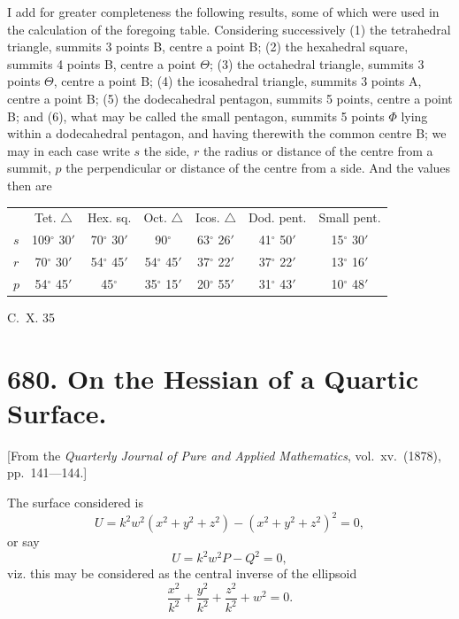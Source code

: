 \documentclass[12pt,a4paper]{article}
\theoremstyle{cayley}
\theoremstyle{definition}
\numberwithin{equation}{section}
\begin{document}
I add for greater completeness the following results, some of which were used in the calculation of the foregoing table. Considering successively (1) the tetrahedral triangle, summits 3 points B, centre a point B; (2) the hexahedral square, summits 4 points B, centre a point $\Theta$; (3) the octahedral triangle, summits 3 points $\Theta$, centre a point B; (4) the icosahedral triangle, summits 3 points A, centre a point B; (5) the dodecahedral pentagon, summits 5 points, centre a point B; and (6), what may be called the small pentagon, summits 5 points $\Phi$ lying within a dodecahedral pentagon, and having therewith the common centre B; we may in each case write $s$ the side, $r$ the radius or distance of the centre from a summit, $p$ the perpendicular or distance of the centre from a side. And the values then are

\begin{center}
\begin{tabular}{lcccccc}
 & Tet. $\triangle$ & Hex. sq. & Oct. $\triangle$ & Icos. $\triangle$ & Dod. pent. & Small pent. \\
$s$ & 109$^\circ$ 30$'$ & 70$^\circ$ 30$'$ & 90$^\circ$ & 63$^\circ$ 26$'$ & 41$^\circ$ 50$'$ & 15$^\circ$ 30$'$ \\
$r$ & 70$^\circ$ 30$'$ & 54$^\circ$ 45$'$ & 54$^\circ$ 45$'$ & 37$^\circ$ 22$'$ & 37$^\circ$ 22$'$ & 13$^\circ$ 16$'$ \\
$p$ & 54$^\circ$ 45$'$ & 45$^\circ$ & 35$^\circ$ 15$'$ & 20$^\circ$ 55$'$ & 31$^\circ$ 43$'$ & 10$^\circ$ 48$'$
\end{tabular}
\end{center}
\hfill C.~X. 35

\newpage

\section*{680. On the Hessian of a Quartic Surface.}

[From the \textit{Quarterly Journal of Pure and Applied Mathematics}, vol.\ xv.\ (1878), pp.\ 141---144.]

The surface considered is
\[
U = k^2 w^2 (x^2 + y^2 + z^2) - (x^2 + y^2 + z^2)^2 = 0,
\]
or say
\[
U = k^2 w^2 P - Q^2 = 0,
\]
viz. this may be considered as the central inverse of the ellipsoid
\[
\frac{x^2}{k^2} + \frac{y^2}{k^2} + \frac{z^2}{k^2} + w^2 = 0.
\]
\end{document}
